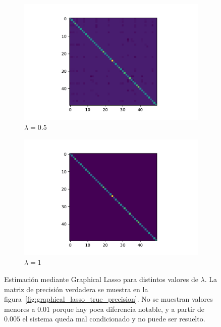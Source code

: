 \documentclass{article}
\begin{document}
\begin{figure}[htb]
\begin{subfigure}[t]{0.32\linewidth}
        \includegraphics[width=\textwidth]{imagenes/graphical_lasso/graphical_lasso_alpha_0_5.pdf}
        \caption{$\lambda = 0.5$}
    \end{subfigure}
    \begin{subfigure}[t]{0.32\linewidth}
        \centering
        \includegraphics[width=\textwidth]{imagenes/graphical_lasso/graphical_lasso_alpha_1.pdf}
        \caption{$\lambda = 1$}
    \end{subfigure}
    \caption{Estimación mediante Graphical Lasso para distintos valores de $\lambda$. La matriz de precisión verdadera se muestra en la figura~\ref{fig:graphical_lasso_true_precision}. No se muestran valores menores a $0.01$ porque hay poca diferencia notable, y a partir de $0.005$ el sistema queda mal condicionado y no puede ser resuelto.
}
    \label{fig:graphical_lasso_alpha_comparison}
\end{figure}
\end{document}
